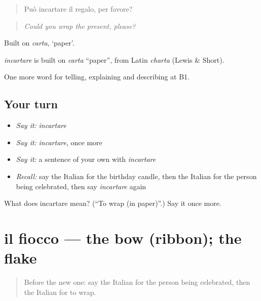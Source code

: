 \begin{quote}
Può incartare il regalo, per favore?
\end{quote}

\begin{quote}
\emph{Could you wrap the present, please?}
\end{quote}

Built on \emph{carta}, ‘paper’.

\begin{cousinweb}
\emph{incartare} is built on \emph{carta} \textquotedblleft{}paper\textquotedblright{}, from Latin \emph{charta} (Lewis \& Short).
\end{cousinweb}

\begin{grammarlens}[title={What you've built}]
One more word for telling, explaining and describing at B1.
\end{grammarlens}

\subsection*{Your turn}
\begin{itemize}
\raggedright
  \item \emph{Say it:} \emph{incartare}
  \item \emph{Say it:} \emph{incartare}, once more
  \item \emph{Say it:} a sentence of your own with \emph{incartare}
  \item \emph{Recall:} say the Italian for the birthday candle, then the Italian for the person being celebrated, then say \emph{incartare} again
\end{itemize}

\begin{tcolorbox}[breakable,colback=teal!4,colframe=teal!35!black,title={Before you move on}]
What does incartare mean? (\textquotedblleft{}To wrap (in paper)\textquotedblright{}.) Say it once more.
\end{tcolorbox}
\section[il fiocco]{il fiocco — the bow (ribbon); the flake}

\label{lesson:IT-C316-fiocco}



\begin{quote}
Before the new one: say the Italian for the person being celebrated, then the Italian for to wrap.
\end{quote}

